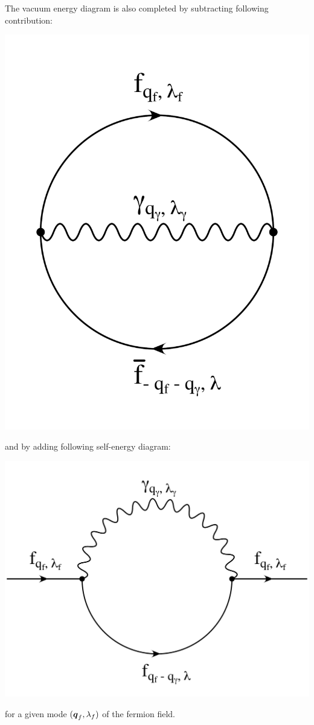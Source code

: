 \documentclass[10pt,a4paper,twoside,openany]{book}
\begin{document}
The vacuum energy diagram is also completed by subtracting following contribution:
\begin{center}
\includegraphics[scale=0.2]{images/diagrams/Charged_Fermion_Energy_2a.pdf}
\end{center}
and by adding following self-energy diagram:
\begin{center}
\includegraphics[scale=0.24]{images/diagrams/Charged_Fermion_Energy_2b.pdf}
\end{center}
for a given mode $(\boldsymbol{q}_f, \lambda_f)$ of the fermion field.
\end{document}
